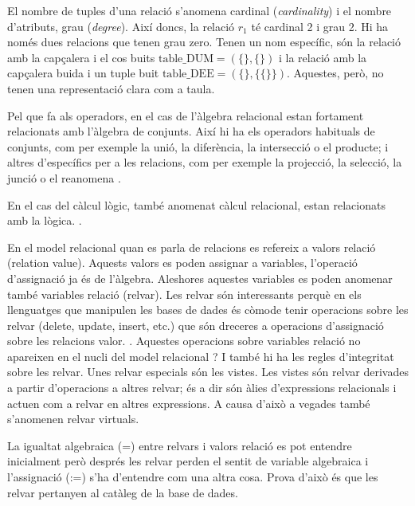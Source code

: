 El nombre de tuples d'una relació s'anomena cardinal
(\emph{cardinality}) i el nombre d'atributs, grau
(\emph{degree}). Així doncs, la relació $r_1$ té cardinal 2 i grau 2.
Hi ha només dues relacions que tenen grau zero. Tenen un nom
específic, són la relació amb la capçalera i el cos buits
$\text{table\_DUM} = (\{\},\{\})$ i la relació amb la capçalera buida
i un tuple buit $\text{table\_DEE} = (\{\},\{\{\}\})$. Aquestes, però, no
tenen una representació clara com a taula.  




\todo{}

Pel que fa als operadors, en el cas de l'àlgebra relacional estan
fortament relacionats amb l'àlgebra de conjunts. Així hi ha els
operadors habituals de conjunts, com per exemple la unió, la
diferència, la intersecció o el producte; i altres d'específics per a
les relacions, com per exemple la projecció, la selecció, la junció o
el reanomena \parencite[cap.~7]{date04:introduction8}.

En el cas del càlcul lògic, també anomenat càlcul relacional, estan relacionats amb la lògica. \parencite[cap.~8]{date04:introduction8}. 






 En el model relacional
quan es parla de relacions es refereix a valors relació (relation value). Aquests valors es poden assignar a variables, l'operació d'assignació ja és de l'àlgebra. Aleshores aquestes variables es poden anomenar també variables relació (relvar). 
Les relvar són interessants perquè en els llenguatges que manipulen les bases de dades és còmode tenir operacions sobre les relvar (delete, update, insert, etc.) que són dreceres a operacions d'assignació sobre les relacions valor. . Aquestes operacions sobre variables relació no apareixen en el nucli del model relacional ? I també hi ha les regles d'integritat sobre les relvar. 
Unes relvar especials són les vistes. Les vistes són relvar derivades a partir d'operacions a altres relvar; és a dir són àlies d'expressions relacionals i actuen com a relvar en altres expressions. A causa d'això a vegades també s'anomenen relvar virtuals. 

La igualtat algebraica (=) entre relvars i valors relació  es pot entendre inicialment però després les relvar perden el sentit de variable algebraica i l'assignació (:=) s'ha d'entendre com una altra cosa.
Prova d'això és que les relvar pertanyen al catàleg de la base de dades.


